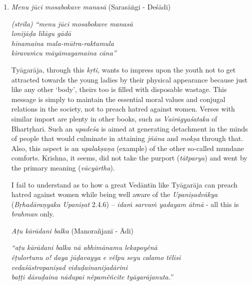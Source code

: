 \begin{enumerate}
\itemsep=0pt

 \item 
 \textit{Menu jūci mosabokave manasā} (Sarasāṅgi - Deśādi)

\begin{centerquote}
\textit{(strīla) “menu jūci mosabokave manasā}\\ \textit{lonijāḍa līlāgu gādā}\\ \textit{hīnamaina mala-mūtra-raktamula}\\ \textit{kiravaṁcu māyāmayamaina cāna”}
\end{centerquote}

 Tyāgarāja, through this \textit{kṛti,} wants to impress upon the youth not to get attracted towards the young ladies by their physical appearance because just like any other ‘body’, theirs too is filled with disposable wastage. This message is simply to maintain the essential moral values and conjugal relations in the society, not to preach hatred against women. Verses with similar import are plenty in other books, such as \textit{Vairāgyaśataka} of Bhartṛhari. Such an \textit{upadeśa} is aimed at generating detachment in the minds of people that would culminate in attaining \textit{jñāna} and \textit{mokṣa} through that. Also, this aspect is an \textit{upalakṣaṇa} (example) of the other so-called mundane comforts. Krishna, it seems, did not take the purport (\textit{tātparya}) and went by the primary meaning (\textit{vācyārtha}).

 I fail to understand as to how a great Vedāntīn like Tyāgarāja can preach hatred against women while being well aware of the \textit{Upaniṣadvākya} (\textit{Bṛhadāraṇyaka Upaniṣat} 2.4.6) – \textit{idaṁ sarvaṁ yadayam ātmā} - all this is \textit{brahman} only.

 \textit{Aṭu kārādani balka} (Manorañjanī - Ādi)

\begin{centerquote}
\textit{“aṭu kārādani balka nā abhimānamu lekapoyênā} \\ \textit{êṭulortunu o! daya jūḍavayya e vêlpu seyu calamo têlisi}\\ \textit{vedaśāstropaniṣad viduḍainanijadārini} \\ \textit{baṭṭi dāsuḍaina nādupai nêpamêñcite tyāgarājanuta.}”
\end{centerquote}


\end{enumerate}
